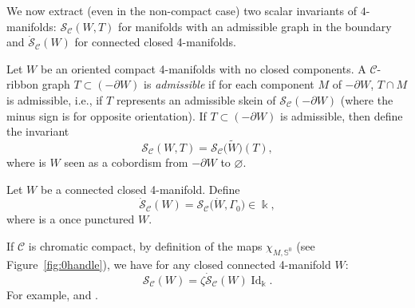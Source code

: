 \documentclass[10pt,a4paper]{amsart}
\numberwithin{equation}{section}
\numberwithin{theorem}{section}
\numberwithin{proposition}{section}
\numberwithin{definition}{section}
\numberwithin{lemma}{section}
\numberwithin{corollary}{section}
\numberwithin{remark}{section}
\numberwithin{example}{section}
\newcommand{\cat}{\mathcal{C}}
\newcommand{\Id}{\operatorname{Id}}
\newcommand{\FK}{{\Bbbk}}
\newcommand{\wt}{\widetilde}
\newcommand{\TSkein}{{\mathscr{S}}}
\newcommand{\Sp}{\mathbb{S}}
\begin{document}
We now extract (even in the non-compact case) two scalar invariants of
$4$-manifolds: $\TSkein_\cat(W,T)$ for manifolds with an admissible
graph in the boundary and $\dot\TSkein_\cat(W)$ for connected closed
4-manifolds.
\begin{definition}
 Let $W$ be an oriented compact 4-manifolds with no closed components.
 A $\cat$-ribbon graph $T\subset(-\partial W)$ is \emph{admissible} if for each
 component $M$ of $-\partial W$, $T\cap M$ is admissible, i.e., if $T$
 represents an admissible skein of $\TSkein_\cat(-\partial W)$ (where
 the minus sign is for opposite orientation).
 If $T\subset(-\partial W)$ is admissible, then
 define the invariant
 \[\TSkein_\cat(W,T)=\TSkein_\cat\bigl(\wt W\bigr)(T),\]
 where \smash{$\wt W$} is $W$ seen
 as a cobordism from $-\partial W$ to
 $\varnothing$.
\end{definition}
\begin{definition}
 Let $W$ be a
 connected closed 4-manifold.
 Define
 \[
 \dot\TSkein_\cat(W)=\TSkein_\cat\bigl(\dot W,\Gamma_0\bigr)\in\FK,
 \]
 where
  is a once punctured $W$.
\end{definition}
If
$\cat$ is chromatic compact, by definition of the maps $\chi_{M,\Sp^0}$ (see Figure~\ref{fig:0handle}), we
have for any closed connected 4-manifold $W$:
\begin{equation*}
 \TSkein_\cat(W)=\zeta\dot\TSkein_\cat(W)\Id_\FK.
\end{equation*}
For example, \smash{$\dot\TSkein_\cat\bigl(S^4\bigr)=1$} and \smash{$\TSkein_\cat\bigl(S^4\bigr)=\zeta\Id_\FK$}.
\end{document}
